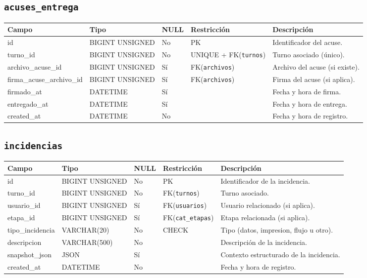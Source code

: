 \documentclass[12pt,a4paper]{article}
\begin{document}
\subsection{\texttt{acuses\_entrega}}
\begin{longtable}{L{3.2cm} L{3.2cm} C{1.2cm} L{2.8cm} L{5.0cm}}
\toprule
\textbf{Campo} & \textbf{Tipo} & \textbf{NULL} & \textbf{Restricción} & \textbf{Descripción} \\
\midrule
\endhead
id & BIGINT UNSIGNED & No & PK & Identificador del acuse. \\
turno\_id & BIGINT UNSIGNED & No & UNIQUE + FK(\texttt{turnos}) & Turno asociado (único). \\
archivo\_acuse\_id & BIGINT UNSIGNED & Sí & FK(\texttt{archivos}) & Archivo del acuse (si existe). \\
firma\_acuse\_archivo\_id & BIGINT UNSIGNED & Sí & FK(\texttt{archivos}) & Firma del acuse (si aplica). \\
firmado\_at & DATETIME & Sí &  & Fecha y hora de firma. \\
entregado\_at & DATETIME & Sí &  & Fecha y hora de entrega. \\
created\_at & DATETIME & No &  & Fecha y hora de registro. \\
\bottomrule
\end{longtable}

\subsection{\texttt{incidencias}}
\begin{longtable}{L{3.2cm} L{3.2cm} C{1.2cm} L{2.8cm} L{5.0cm}}
\toprule
\textbf{Campo} & \textbf{Tipo} & \textbf{NULL} & \textbf{Restricción} & \textbf{Descripción} \\
\midrule
\endhead
id & BIGINT UNSIGNED & No & PK & Identificador de la incidencia. \\
turno\_id & BIGINT UNSIGNED & No & FK(\texttt{turnos}) & Turno asociado. \\
usuario\_id & BIGINT UNSIGNED & Sí & FK(\texttt{usuarios}) & Usuario relacionado (si aplica). \\
etapa\_id & BIGINT UNSIGNED & Sí & FK(\texttt{cat\_etapas}) & Etapa relacionada (si aplica). \\
tipo\_incidencia & VARCHAR(20) & No & CHECK & Tipo (datos, impresion, flujo u otro). \\
descripcion & VARCHAR(500) & No &  & Descripción de la incidencia. \\
snapshot\_json & JSON & Sí &  & Contexto estructurado de la incidencia. \\
created\_at & DATETIME & No &  & Fecha y hora de registro. \\
\bottomrule
\end{longtable}
\end{document}

